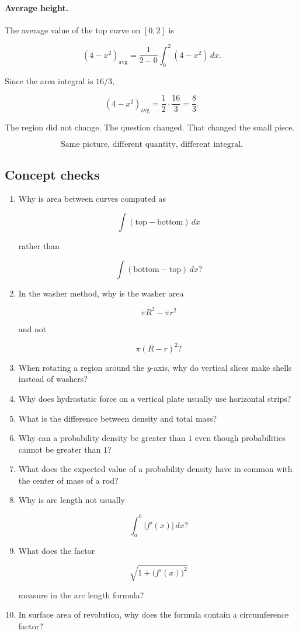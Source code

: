 \paragraph{Average height.}
The average value of the top curve on \([0,2]\) is

\[
(4-x^2)_{\text{avg}}
=
\frac1{2-0}\int_0^2(4-x^2)\,dx.
\]

Since the area integral is \(16/3\),

\[
(4-x^2)_{\text{avg}}
=
\frac12\cdot\frac{16}{3}
=
\boxed{\frac83}.
\]

The region did not change.  The question changed.  That changed the small piece.

\[
\boxed{
\text{Same picture, different quantity, different integral.}
}
\]

\subsection{Concept checks}
\label{subsec:chapter10-concept-checks}

\begin{enumerate}
\item Why is area between curves computed as

\[
\int(\text{top}-\text{bottom})\,dx
\]

rather than

\[
\int(\text{bottom}-\text{top})\,dx?
\]

\item In the washer method, why is the washer area

\[
\pi R^2-\pi r^2
\]

and not

\[
\pi(R-r)^2?
\]

\item When rotating a region around the \(y\)-axis, why do vertical slices make shells
instead of washers?

\item Why does hydrostatic force on a vertical plate usually use horizontal strips?

\item What is the difference between density and total mass?

\item Why can a probability density be greater than \(1\) even though probabilities
cannot be greater than \(1\)?

\item What does the expected value of a probability density have in common with the
center of mass of a rod?

\item Why is arc length not usually

\[
\int_a^b |f'(x)|\,dx?
\]

\item What does the factor

\[
\sqrt{1+\bigl(f'(x)\bigr)^2}
\]

measure in the arc length formula?

\item In surface area of revolution, why does the formula contain a circumference factor?
\end{enumerate}

